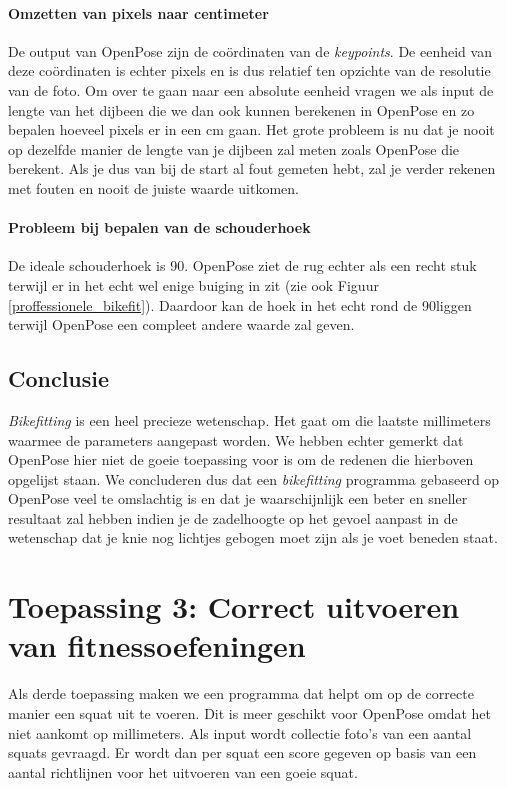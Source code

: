 \documentclass[a4paper,twoside,kulak]{kulakreport}
\begin{document}
\paragraph{Omzetten van pixels naar centimeter}
De output van OpenPose zijn de coördinaten van de \textit{keypoints}. De eenheid van deze coördinaten is echter pixels en is dus relatief ten opzichte van de resolutie van de foto. Om over te gaan naar een absolute eenheid vragen we als input de lengte van het dijbeen die we dan ook kunnen berekenen in OpenPose en zo bepalen hoeveel pixels er in een \si{cm} gaan. Het grote probleem is nu dat je nooit op dezelfde manier de lengte van je dijbeen zal meten zoals OpenPose die berekent. Als je dus van bij de start al fout gemeten hebt, zal je verder rekenen met fouten en nooit de juiste waarde uitkomen.

\paragraph{Probleem bij bepalen van de schouderhoek}
De ideale schouderhoek is 90\degree. OpenPose ziet de rug echter als een recht stuk terwijl er in het echt wel enige buiging in zit (zie ook Figuur \ref{proffessionele_bikefit}). Daardoor kan de hoek in het echt rond de 90\degree liggen terwijl OpenPose een compleet andere waarde zal geven.

\subsection{Conclusie}
\textit{Bikefitting} is een heel precieze wetenschap. Het gaat om die laatste millimeters waarmee de parameters aangepast worden. We hebben echter gemerkt dat OpenPose hier niet de goeie toepassing voor is om de redenen die hierboven opgelijst staan. We concluderen dus dat een \textit{bikefitting} programma gebaseerd op OpenPose veel te omslachtig is en dat je waarschijnlijk een beter en sneller resultaat zal hebben indien je de zadelhoogte op het gevoel aanpast in de wetenschap dat je knie nog lichtjes gebogen moet zijn als je voet beneden staat.


\section{Toepassing 3: Correct uitvoeren van fitnessoefeningen}

Als derde toepassing maken we een programma dat helpt om op de correcte manier een squat uit te voeren. Dit is meer geschikt voor OpenPose omdat het niet aankomt op millimeters. Als input wordt collectie foto's van een aantal squats gevraagd. Er wordt dan per squat een score gegeven op basis van een aantal richtlijnen voor het uitvoeren van een goeie squat.\cite{squats} 
\end{document}
